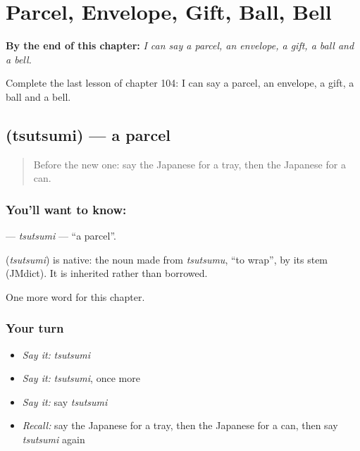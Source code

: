 
\chapter{Parcel, Envelope, Gift, Ball, Bell}
\label{ch:ja-parcel-envelope-gift-ball-bell}

\begin{chapteropening}
\textbf{By the end of this chapter:} \emph{I can say a parcel, an envelope, a gift, a ball and a bell.}

Complete the last lesson of chapter 104: I can say a parcel, an envelope, a gift, a ball and a bell.
\end{chapteropening}

\section[\texorpdfstring{\ja{つつみ} (tsutsumi)}{つつみ (tsutsumi)}]{ (tsutsumi) — a parcel}

\label{lesson:JA-C104-tsutsumi}



\begin{quote}
Before the new one: say the Japanese for a tray, then the Japanese for a can.
\end{quote}

\subsection*{You'll want to know: }
\textbf{} — \emph{tsutsumi} — \textquotedblleft{}a parcel\textquotedblright{}.

\begin{cousinweb}
\textbf{} (\emph{tsutsumi}) is native: the noun made from \emph{tsutsumu}, \textquotedblleft{}to wrap\textquotedblright{}, by its stem (JMdict). It is inherited rather than borrowed.
\end{cousinweb}

\begin{grammarlens}[title={What you've built}]
One more word for this chapter.
\end{grammarlens}

\subsection*{Your turn}
\begin{itemize}
\raggedright
  \item \emph{Say it:} \emph{tsutsumi}
  \item \emph{Say it:} \emph{tsutsumi}, once more
  \item \emph{Say it:} say \emph{tsutsumi}
  \item \emph{Recall:} say the Japanese for a tray, then the Japanese for a can, then say \emph{tsutsumi} again
\end{itemize}

